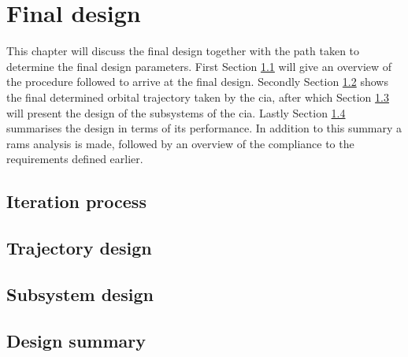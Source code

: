 \section{Final design}\label{cha:finaldesign}
This chapter will discuss the final design together with the path taken to determine the final design parameters. First Section \ref{sec:iterationprocess} will give an overview of the procedure followed to arrive at the final design. Secondly Section \ref{sec:trajectorydesign} shows the final determined orbital trajectory taken by the \gls{cia}, after which Section \ref{sec:subsystemdesign} will present the design of the subsystems of the \gls{cia}. Lastly Section \ref{sec:designsummary} summarises the design in terms of its performance. In addition to this summary a \gls{rams} analysis is made, followed by an overview of the compliance to the requirements defined earlier.

\subsection{Iteration process} \label{sec:iterationprocess}


\subsection{Trajectory design} \label{sec:trajectorydesign}


\subsection{Subsystem design} \label{sec:subsystemdesign}


\subsection{Design summary} \label{sec:designsummary}

